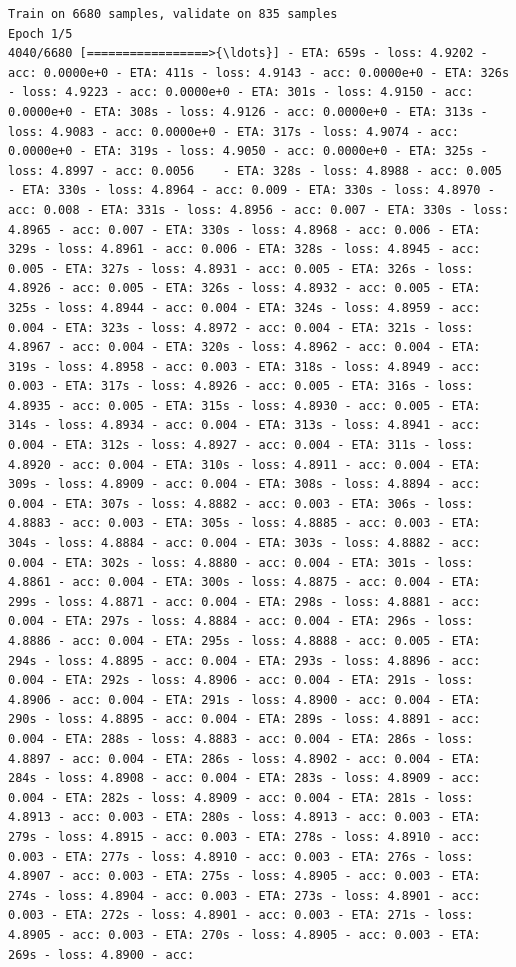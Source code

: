 \documentclass[11pt]{article}
\begin{document}
    \begin{Verbatim}[commandchars=\\\{\}]
Train on 6680 samples, validate on 835 samples
Epoch 1/5
4040/6680 [=================>{\ldots}] - ETA: 659s - loss: 4.9202 - acc: 0.0000e+0 - ETA: 411s - loss: 4.9143 - acc: 0.0000e+0 - ETA: 326s - loss: 4.9223 - acc: 0.0000e+0 - ETA: 301s - loss: 4.9150 - acc: 0.0000e+0 - ETA: 308s - loss: 4.9126 - acc: 0.0000e+0 - ETA: 313s - loss: 4.9083 - acc: 0.0000e+0 - ETA: 317s - loss: 4.9074 - acc: 0.0000e+0 - ETA: 319s - loss: 4.9050 - acc: 0.0000e+0 - ETA: 325s - loss: 4.8997 - acc: 0.0056    - ETA: 328s - loss: 4.8988 - acc: 0.005 - ETA: 330s - loss: 4.8964 - acc: 0.009 - ETA: 330s - loss: 4.8970 - acc: 0.008 - ETA: 331s - loss: 4.8956 - acc: 0.007 - ETA: 330s - loss: 4.8965 - acc: 0.007 - ETA: 330s - loss: 4.8968 - acc: 0.006 - ETA: 329s - loss: 4.8961 - acc: 0.006 - ETA: 328s - loss: 4.8945 - acc: 0.005 - ETA: 327s - loss: 4.8931 - acc: 0.005 - ETA: 326s - loss: 4.8926 - acc: 0.005 - ETA: 326s - loss: 4.8932 - acc: 0.005 - ETA: 325s - loss: 4.8944 - acc: 0.004 - ETA: 324s - loss: 4.8959 - acc: 0.004 - ETA: 323s - loss: 4.8972 - acc: 0.004 - ETA: 321s - loss: 4.8967 - acc: 0.004 - ETA: 320s - loss: 4.8962 - acc: 0.004 - ETA: 319s - loss: 4.8958 - acc: 0.003 - ETA: 318s - loss: 4.8949 - acc: 0.003 - ETA: 317s - loss: 4.8926 - acc: 0.005 - ETA: 316s - loss: 4.8935 - acc: 0.005 - ETA: 315s - loss: 4.8930 - acc: 0.005 - ETA: 314s - loss: 4.8934 - acc: 0.004 - ETA: 313s - loss: 4.8941 - acc: 0.004 - ETA: 312s - loss: 4.8927 - acc: 0.004 - ETA: 311s - loss: 4.8920 - acc: 0.004 - ETA: 310s - loss: 4.8911 - acc: 0.004 - ETA: 309s - loss: 4.8909 - acc: 0.004 - ETA: 308s - loss: 4.8894 - acc: 0.004 - ETA: 307s - loss: 4.8882 - acc: 0.003 - ETA: 306s - loss: 4.8883 - acc: 0.003 - ETA: 305s - loss: 4.8885 - acc: 0.003 - ETA: 304s - loss: 4.8884 - acc: 0.004 - ETA: 303s - loss: 4.8882 - acc: 0.004 - ETA: 302s - loss: 4.8880 - acc: 0.004 - ETA: 301s - loss: 4.8861 - acc: 0.004 - ETA: 300s - loss: 4.8875 - acc: 0.004 - ETA: 299s - loss: 4.8871 - acc: 0.004 - ETA: 298s - loss: 4.8881 - acc: 0.004 - ETA: 297s - loss: 4.8884 - acc: 0.004 - ETA: 296s - loss: 4.8886 - acc: 0.004 - ETA: 295s - loss: 4.8888 - acc: 0.005 - ETA: 294s - loss: 4.8895 - acc: 0.004 - ETA: 293s - loss: 4.8896 - acc: 0.004 - ETA: 292s - loss: 4.8906 - acc: 0.004 - ETA: 291s - loss: 4.8906 - acc: 0.004 - ETA: 291s - loss: 4.8900 - acc: 0.004 - ETA: 290s - loss: 4.8895 - acc: 0.004 - ETA: 289s - loss: 4.8891 - acc: 0.004 - ETA: 288s - loss: 4.8883 - acc: 0.004 - ETA: 286s - loss: 4.8897 - acc: 0.004 - ETA: 286s - loss: 4.8902 - acc: 0.004 - ETA: 284s - loss: 4.8908 - acc: 0.004 - ETA: 283s - loss: 4.8909 - acc: 0.004 - ETA: 282s - loss: 4.8909 - acc: 0.004 - ETA: 281s - loss: 4.8913 - acc: 0.003 - ETA: 280s - loss: 4.8913 - acc: 0.003 - ETA: 279s - loss: 4.8915 - acc: 0.003 - ETA: 278s - loss: 4.8910 - acc: 0.003 - ETA: 277s - loss: 4.8910 - acc: 0.003 - ETA: 276s - loss: 4.8907 - acc: 0.003 - ETA: 275s - loss: 4.8905 - acc: 0.003 - ETA: 274s - loss: 4.8904 - acc: 0.003 - ETA: 273s - loss: 4.8901 - acc: 0.003 - ETA: 272s - loss: 4.8901 - acc: 0.003 - ETA: 271s - loss: 4.8905 - acc: 0.003 - ETA: 270s - loss: 4.8905 - acc: 0.003 - ETA: 269s - loss: 4.8900 - acc: 
\end{Verbatim}
\end{document}
